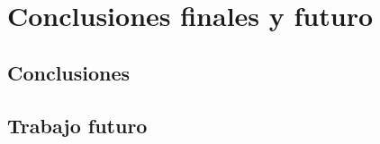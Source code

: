 \chapter{Conclusiones finales y futuro}
\label{ch:conclusiones}

\section{Conclusiones}

\section{Trabajo futuro}
